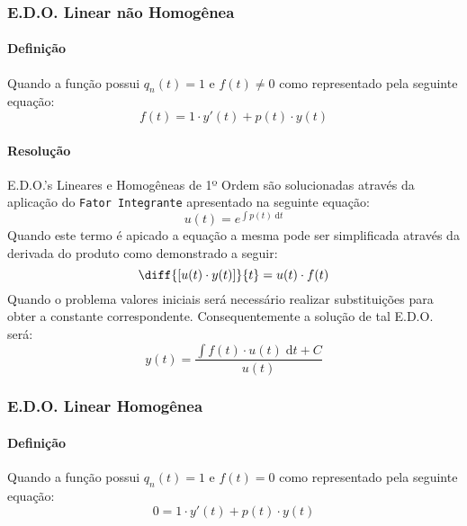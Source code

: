 \documentclass{article}
\begin{document}
            \subsubsection{E.D.O. Linear não Homogênea}
                \paragraph{Definição}Quando a função possui $q_{n}(t) = 1$ e $f(t) \neq 0$ como representado pela seguinte equação:
                    \begin{equation}
                        f(t) = 1 \cdot y'(t) + p(t) \cdot y(t)
                    \end{equation}

                \paragraph{Resolução}E.D.O.'s Lineares e Homogêneas de 1º Ordem são solucionadas através da aplicação do \texttt{Fator Integrante} apresentado na seguinte equação:
                    \begin{equation*}
                        u(t) = e^{\int p(t)\;\text{d}t}
                    \end{equation*}
                Quando este termo é apicado a equação a mesma pode ser simplificada através da derivada do produto como demonstrado a seguir:
                    \begin{equation*}
                        \diff{[u(t) \cdot y(t)]}{t} = u(t) \cdot f(t)
                    \end{equation*}
                Quando o problema valores iniciais será necessário realizar substituições para obter a constante correspondente. Consequentemente a solução de tal E.D.O. será:
                    \begin{equation}
                        \boxed{
                            y(t) = \frac{\int{f(t) \cdot u(t)\;\text{d}t + C}}{u(t)}
                        }
                    \end{equation}

            \subsubsection{E.D.O. Linear Homogênea}
                \paragraph{Definição}Quando a função possui $q_{n}(t) = 1$ e $f(t) = 0$ como representado pela seguinte equação:
                    \begin{equation}
                        0 = 1 \cdot y'(t) + p(t) \cdot y(t)
                    \end{equation}
\end{document}
